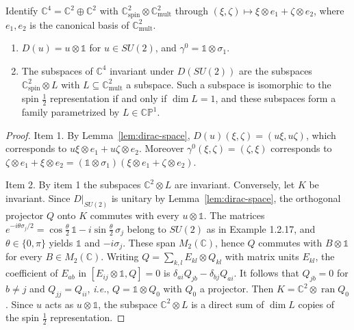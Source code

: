 \begin{lemma}\label{lem:su2-subspaces}
	Identify $\mathbb{C}^4=\mathbb{C}^2\oplus\mathbb{C}^2$ with $\mathbb{C}^2_{\mathrm{spin}}\otimes\mathbb{C}^2_{\mathrm{mult}}$ through $(\xi,\zeta)\mapsto\xi\otimes e_1+\zeta\otimes e_2$, where $e_1,e_2$ is the canonical basis of $\mathbb{C}^2_{\mathrm{mult}}$.
	\begin{enumerate}
		\item $D(u)=u\otimes\mathbb{1}$ for $u\in SU(2)$, and $\gamma^0=\mathbb{1}\otimes\sigma_1$.
		\item The subspaces of $\mathbb{C}^4$ invariant under $D(SU(2))$ are the subspaces $\mathbb{C}^2_{\mathrm{spin}}\otimes L$ with $L\subseteq\mathbb{C}^2_{\mathrm{mult}}$ a subspace. Such a subspace is isomorphic to the spin $\frac12$ representation if and only if $\dim L=1$, and these subspaces form a family parametrized by $L\in\mathbb{CP}^1$.
	\end{enumerate}
\end{lemma}

\begin{proof}
	Item 1. By Lemma~\ref{lem:dirac-space}, $D(u)(\xi,\zeta)=(u\xi,u\zeta)$, which corresponds to $u\xi\otimes e_1+u\zeta\otimes e_2$. Moreover $\gamma^0(\xi,\zeta)=(\zeta,\xi)$ corresponds to $\zeta\otimes e_1+\xi\otimes e_2=(\mathbb{1}\otimes\sigma_1)(\xi\otimes e_1+\zeta\otimes e_2)$.
	
	Item 2. By item 1 the subspaces $\mathbb{C}^2\otimes L$ are invariant. Conversely, let $K$ be invariant. Since $D|_{SU(2)}$ is unitary by Lemma~\ref{lem:dirac-space}, the orthogonal projector $Q$ onto $K$ commutes with every $u\otimes\mathbb{1}$. The matrices $e^{-i\theta\sigma_j/2}=\cos\frac\theta2\,\mathbb{1}-i\sin\frac\theta2\,\sigma_j$ belong to $SU(2)$ as in Example 1.2.17, and $\theta\in\{0,\pi\}$ yields $\mathbb{1}$ and $-i\sigma_j$. These span $M_2(\mathbb{C})$, hence $Q$ commutes with $B\otimes\mathbb{1}$ for every $B\in M_2(\mathbb{C})$. Writing $Q=\sum_{k,l}E_{kl}\otimes Q_{kl}$ with matrix units $E_{kl}$, the coefficient of $E_{ab}$ in $[E_{ij}\otimes\mathbb{1},Q]=0$ is $\delta_{ai}Q_{jb}-\delta_{bj}Q_{ai}$. It follows that $Q_{jb}=0$ for $b\neq j$ and $Q_{jj}=Q_{ii}$, \textit{i.e.}, $Q=\mathbb{1}\otimes Q_0$ with $Q_0$ a projector. Then $K=\mathbb{C}^2\otimes\operatorname{ran}Q_0$. Since $u$ acts as $u\otimes\mathbb{1}$, the subspace $\mathbb{C}^2\otimes L$ is a direct sum of $\dim L$ copies of the spin $\frac12$ representation.
\end{proof}

